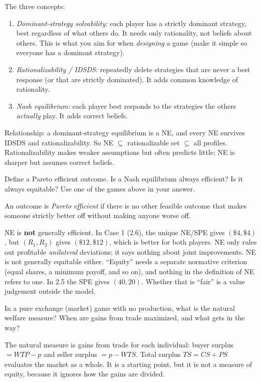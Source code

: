 \begin{description}
\begin{solution}
The three concepts:
\begin{enumerate}[nosep]
\item \emph{Dominant-strategy solvability:} each player has a strictly dominant strategy, best regardless of what others do. It needs only rationality, not beliefs about others. This is what you aim for when \emph{designing} a game (make it simple so everyone has a dominant strategy).
\item \emph{Rationalizability / IDSDS:} repeatedly delete strategies that are never a best response (or that are strictly dominated). It adds common knowledge of rationality.
\item \emph{Nash equilibrium:} each player best responds to the strategies the others \emph{actually} play. It adds correct beliefs.
\end{enumerate}
Relationship: a dominant-strategy equilibrium is a NE, and every NE survives IDSDS and rationalizability. So NE $\subseteq$ rationalizable set $\subseteq$ all profiles. Rationalizability makes weaker assumptions but often predicts little; NE is sharper but assumes correct beliefs.
\end{solution}
\item[3.3] Define a Pareto efficient outcome. Is a Nash equilibrium always efficient? Is it always equitable? Use one of the games above in your answer.
\begin{solution}
An outcome is \emph{Pareto efficient} if there is no other feasible outcome that makes someone strictly better off without making anyone worse off.

NE is \textbf{not} generally efficient. In Case 1 (2.6), the unique NE/SPE gives $(\$4,\$4)$, but $(R_1,R_2)$ gives $(\$12,\$12)$, which is better for both players. NE only rules out profitable \emph{unilateral} deviations; it says nothing about joint improvements. NE is not generally equitable either. ``Equity'' needs a separate normative criterion (equal shares, a minimum payoff, and so on), and nothing in the definition of NE refers to one. In 2.5 the SPE gives $(40,20)$. Whether that is ``fair'' is a value judgement outside the model.
\end{solution}
\item[3.4] In a pure exchange (market) game with no production, what is the natural welfare measure? When are gains from trade maximized, and what gets in the way?
\begin{solution}
The natural measure is gains from trade for each individual: buyer surplus $=WTP-p$ and seller surplus $=p-WTS$. Total surplus $TS=CS+PS$ evaluates the market as a whole. It is a starting point, but it is not a measure of equity, because it ignores how the gains are divided.


\end{solution}
\end{description}
